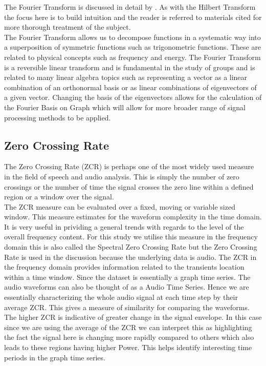 The Fourier Transform is discussed in detail by \citeauthor{Tao2012}\cite{Tao2012}. As with the Hilbert Transform the focus here is to build intuition and the reader is referred to materials cited for more thorough treatment of the subject. \\

The Fourier Transform allows us to decompose functions in a systematic way into a superposition of symmetric functions such as trigonometric functions. These are related to physical concepts such as frequency and energy. The Fourier Transform is a reversible linear transform and is fundamental in the study of groups and is related to many linear algebra topics such as representing a vector as a linear combination of an orthonormal basis or as linear combinations of eigenvectors of a given vector. Changing the basis of the eigenvectors allows for the calculation of the Fourier Basis on Graph which will allow for more broader range of signal processing methods to be applied. \cite{Perraudin2016}

\subsection{Zero Crossing Rate}

The Zero Crossing Rate (ZCR) is perhaps one of the most widely used measure in the field of speech and audio analysis. This is simply the number of zero crossings or the number of time the signal crosses the zero line within a defined region or a window over the signal. \cite{Gouyon,TerrazasGonzalez2016}\\

The ZCR measure can be evaluated over a fixed, moving or variable sized window. This measure estimates for the waveform complexity in the time domain. It is very useful in prividing a general trends with regards to the level of the overall frequency content. For this study we utilise this measure in the frequency domain this is also called the Spectral Zero Crossing Rate but the Zero Crossing Rate is used in the discussion because the underlying data is audio. The ZCR in the frequency domain provides information related to the transients location within a time window. Since the dataset is essentially a graph time series. The audio waveforms can also be thought of as a Audio Time Series. Hence we are essentially characterizing the whole audio signal at each time step by their average ZCR. This gives a measure of similarity for comparing the waveforms. The higher ZCR is indicative of greater change in the signal envelope. In this case since we are using the average of the ZCR we can interpret this as highlighting the fact the signal here is changing more rapidly compared to others which also leads to these regions having higher Power. This helps identify interesting time periods in the graph time series. \cite{TerrazasGonzalez2016}

